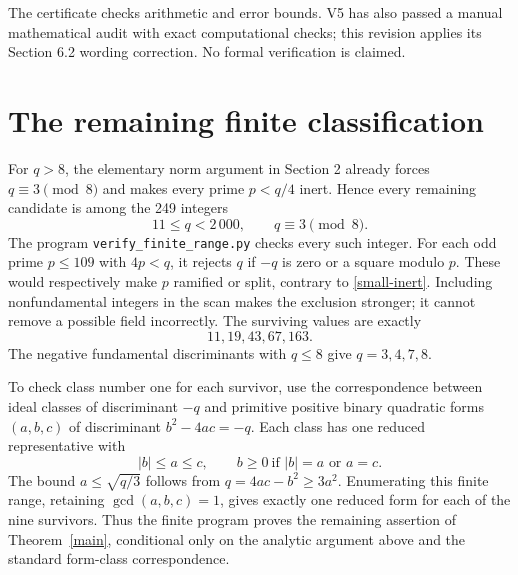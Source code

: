 \documentclass[11pt]{article}
\begin{document}
The certificate checks arithmetic and error bounds. V5 has also passed
a manual mathematical audit with exact computational checks; this revision
applies its Section 6.2 wording correction. No formal verification is claimed.

\section{The remaining finite classification}\label{finite}

For \(q>8\), the elementary norm argument in
Section 2 already forces \(q\equiv3\pmod8\) and makes every prime
\(p<q/4\) inert. Hence every remaining candidate is among the 249
integers
\[
 11\le q<2\,000,\qquad q\equiv3\pmod8.
\]
The program \texttt{verify\_finite\_range.py} checks every such integer.
For each odd prime \(p\le109\) with \(4p<q\), it rejects \(q\) if
\(-q\) is zero or a square modulo \(p\). These would respectively
make \(p\) ramified or split, contrary to \eqref{small-inert}.
Including nonfundamental integers in the scan makes the exclusion
stronger; it cannot remove a possible field incorrectly.
The surviving values are exactly
\[
 11,19,43,67,163.
\]
The negative fundamental discriminants with \(q\le8\) give
\(q=3,4,7,8\).

To check class number one for each survivor, use the correspondence
between ideal classes of discriminant \(-q\) and primitive positive
binary quadratic forms \((a,b,c)\) of discriminant
\(b^2-4ac=-q\). Each class has one reduced representative with
\[
 |b|\le a\le c,\qquad
 b\ge0\ \text{if }|b|=a\text{ or }a=c.
\]
The bound \(a\le\sqrt{q/3}\) follows from
\(q=4ac-b^2\ge3a^2\). Enumerating this finite range, retaining
\(\gcd(a,b,c)=1\), gives exactly one reduced form for each of the
nine survivors. Thus the finite program proves the remaining assertion
of Theorem~\ref{main}, conditional only on the analytic argument above
and the standard form-class correspondence.
\end{document}
